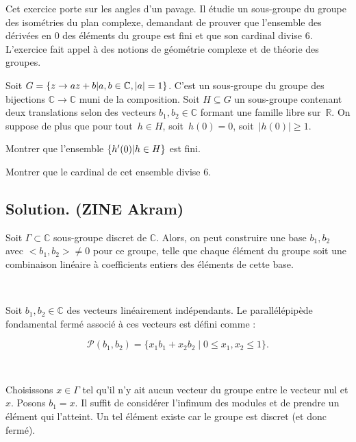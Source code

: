 Cet exercice porte sur les angles d'un pavage. Il {\'e}tudie un sous-groupe du
groupe des isom{\'e}tries du plan complexe, demandant de prouver que
l'ensemble des d{\'e}riv{\'e}es en 0 des {\'e}l{\'e}ments du groupe est fini
et que son cardinal divise 6. L'exercice fait appel {\`a} des notions de
g{\'e}om{\'e}trie complexe et de th{\'e}orie des groupes.

\begin{exercise}
Soit $G = \{ z \to az + b |  a, b \in \mathbb{C}, |a| = 1 \}$. C'est
un sous-groupe du groupe des bijections $\mathbb{C} \to \mathbb{C}$ muni de la
composition. Soit $H \subseteq G$ un sous-groupe contenant deux translations
selon des vecteurs $b_1, b_2 \in \mathbb{C}$ formant une famille libre
sur~$\mathbb{R}$. On suppose de plus que pour tout~$h \in H$, soit~$h (0) =
0$, soit~$|h (0) | \geq 1$.

Montrer que l'ensemble $\{ h' (0) |  h \in H \}$ est fini.

Montrer que le cardinal de cet ensemble divise 6.

\end{exercise}

\subsection*{Solution. (ZINE Akram)}



Soit $\Gamma \subset \mathbb{C}$ sous-groupe discret de $\mathbb{C}$. Alors,
on peut construire une base $b_1, b_2$ avec $< b_1, b_2 > \neq 0$ pour ce
groupe, telle que chaque {\'e}l{\'e}ment du groupe soit une combinaison
lin{\'e}aire {\`a} coefficients entiers des {\'e}l{\'e}ments de cette base.

\


Soit $b_1, b_2 \in \mathbb{C}$ des vecteurs lin{\'e}airement ind{\'e}pendants.
Le parall{\'e}l{\'e}pip{\`e}de fondamental ferm{\'e} associ{\'e} {\`a} ces
vecteurs est d{\'e}fini comme :

\[ \mathcal{P}(b_1, b_2) = \{ x_1 b_1 + x_2 b_2 \mid 0 \leq x_1, x_2 \leq 1 \} . \]

\


Choisissons $x \in \Gamma$ tel qu'il n'y ait aucun vecteur du groupe entre le
vecteur nul et $x$. Posons $b_1 = x$. Il suffit de consid{\'e}rer l'infimum
des modules et de prendre un {\'e}l{\'e}ment qui l'atteint. Un tel
{\'e}l{\'e}ment existe car le groupe est discret (et donc ferm{\'e}).

